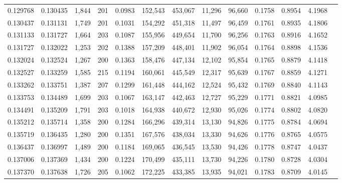 \begin{tabular}{rrrrrrrrrrrrr}
0.129768 & 0.130435 & 1,844 & 201 &                                     0.0983 & 152,543 & 453,067 &  11,296 &  96,660 & 0.1758 & 0.8954 & 4.1968 \\
0.130437 & 0.131131 & 1,749 & 201 &                                     0.1031 & 154,292 & 451,318 &  11,497 &  96,459 & 0.1761 & 0.8935 & 4.1806 \\
0.131133 & 0.131727 & 1,664 & 203 &                                     0.1087 & 155,956 & 449,654 &  11,700 &  96,256 & 0.1763 & 0.8916 & 4.1652 \\
0.131727 & 0.132022 & 1,253 & 202 &                                     0.1388 & 157,209 & 448,401 &  11,902 &  96,054 & 0.1764 & 0.8898 & 4.1536 \\
0.132024 & 0.132524 & 1,267 & 200 &                                     0.1363 & 158,476 & 447,134 &  12,102 &  95,854 & 0.1765 & 0.8879 & 4.1418 \\
0.132527 & 0.133259 & 1,585 & 215 &                                     0.1194 & 160,061 & 445,549 &  12,317 &  95,639 & 0.1767 & 0.8859 & 4.1271 \\
0.133262 & 0.133751 & 1,387 & 207 &                                     0.1299 & 161,448 & 444,162 &  12,524 &  95,432 & 0.1769 & 0.8840 & 4.1143 \\
0.133753 & 0.134489 & 1,699 & 203 &                                     0.1067 & 163,147 & 442,463 &  12,727 &  95,229 & 0.1771 & 0.8821 & 4.0985 \\
0.134491 & 0.135209 & 1,791 & 203 &                                     0.1018 & 164,938 & 440,672 &  12,930 &  95,026 & 0.1774 & 0.8802 & 4.0820 \\
0.135212 & 0.135714 & 1,358 & 200 &                                     0.1284 & 166,296 & 439,314 &  13,130 &  94,826 & 0.1775 & 0.8784 & 4.0694 \\
0.135719 & 0.136435 & 1,280 & 200 &                                     0.1351 & 167,576 & 438,034 &  13,330 &  94,626 & 0.1776 & 0.8765 & 4.0575 \\
0.136437 & 0.136997 & 1,489 & 200 &                                     0.1184 & 169,065 & 436,545 &  13,530 &  94,426 & 0.1778 & 0.8747 & 4.0437 \\
0.137006 & 0.137369 & 1,434 & 200 &                                     0.1224 & 170,499 & 435,111 &  13,730 &  94,226 & 0.1780 & 0.8728 & 4.0304 \\
0.137370 & 0.137638 & 1,726 & 205 &                                     0.1062 & 172,225 & 433,385 &  13,935 &  94,021 & 0.1783 & 0.8709 & 4.0145 \\

\end{tabular}

